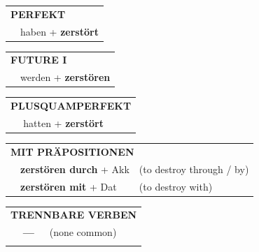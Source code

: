 \documentclass[10pt,a4paper]{revtex4-2}
\begin{document}
\begin{verbbox}
 \begin{tabular}{rl}
     \multicolumn{2}{l}{\textbf{PERFEKT}}\\
   & haben + \textbf{zerstört}\\
  \end{tabular}
\hfill
   \begin{tabular}{rl}
    \multicolumn{2}{l}{\textbf{FUTURE I} }\\
   & werden + \textbf{zerstören}\\
  \end{tabular}
\hfill
   \begin{tabular}{rl}
      \multicolumn{2}{l}{\textbf{PLUSQUAMPERFEKT}}\\
   & hatten + \textbf{zerstört}\\
  \end{tabular}

   \vspace{10pt}

   \begin{tabular}{lll}
      \multicolumn{3}{l}{\textbf{MIT PRÄPOSITIONEN}}\\
& \textbf{zerstören durch} + Akk & (to destroy through / by)\\
& \textbf{zerstören mit} + Dat & (to destroy with)\\
\end{tabular}
  \hfill
   \begin{tabular}{lll}
      \multicolumn{3}{l}{\textbf{TRENNBARE VERBEN}}\\
 & \textbf{---} & (none common)\\
\vspace{10pt}
  \end{tabular}

  \vspace{-5pt}

\end{verbbox}
\end{document}
